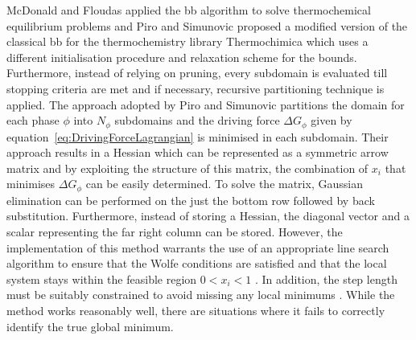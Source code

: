 McDonald and Floudas \cite{McDonald95} applied the \gls{bb} algorithm to solve thermochemical equilibrium problems and Piro and Simunovic \cite{Piro16} proposed a modified version of the classical \gls{bb} for the thermochemistry library {Thermochimica} which uses a different initialisation procedure and relaxation scheme for the bounds. Furthermore, instead of relying on pruning, every subdomain is evaluated till stopping criteria are met and if necessary, recursive partitioning technique is applied. The approach adopted by Piro and Simunovic \cite{Piro16} partitions the domain for each phase $\phi$ into $N_\phi$ subdomains and the driving force $\Delta G_\phi$ given by equation~\eqref{eq:DrivingForceLagrangian} is minimised in each subdomain. Their approach results in a Hessian which can be represented as a symmetric arrow matrix and by exploiting the structure of this matrix, the combination of $x_i$ that minimises $\Delta G_\phi$ can be easily determined. To solve the matrix, Gaussian elimination can be performed on the just the bottom row followed by back substitution. Furthermore, instead of storing a Hessian, the diagonal vector and a scalar representing the far right column can be stored. However, the implementation of this method warrants the use of an appropriate line search algorithm to ensure that the Wolfe conditions are satisfied and that the local system stays within the feasible region $0 < x_i <1$ . In addition, the step length must be suitably constrained to avoid missing any local minimums \cite{Piro16}. While the method works reasonably well, there are situations where it fails to correctly identify the true global minimum.

